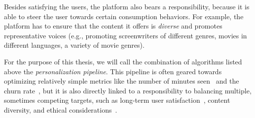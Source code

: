 Besides satisfying the users, the platform also bears a responsibility, because it is able to steer the user towards certain consumption behaviors. For example, the platform has to ensure that the content it offers is \emph{diverse} and promotes representative voices (e.g., promoting screenwriters of different genres, movies in different languages, a variety of movie genres). %

For the purpose of this thesis, we will call the combination of algorithms listed above the \emph{personalization pipeline}. 
This pipeline is often geared towards optimizing relatively simple metrics like the number of minutes seen~\cite{spotifyIntent} and the churn rate~\cite{oldChurn}, but it is also directly linked to a responsibility to balancing multiple, sometimes competing targets, such as long-term user satisfaction~\cite{longTerm}, content diversity, and  ethical considerations~\cite{helberger}.



